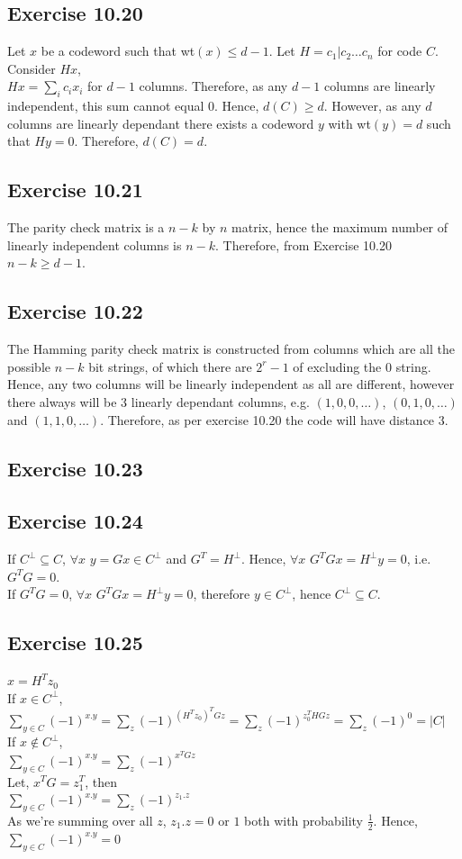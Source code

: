 \documentclass[a4paper,12pt]{article}
\begin{document}
\subsection*{Exercise 10.20}
Let $x$ be a codeword such that wt$(x)\leq d-1$. Let $H={c_1|c_2\ldots c_n}$ for code $C$. Consider $Hx$,\\
$Hx=\displaystyle \sum_ic_ix_i$ for $d-1$ columns. Therefore, as any $d-1$ columns are linearly
independent, this sum cannot equal $0$. Hence, $d(C)\geq d$. However, as any $d$ columns
are linearly dependant there exists a codeword $y$ with wt$(y)=d$ such that $Hy=0$. Therefore,
$d(C)=d$.
\subsection*{Exercise 10.21}
The parity check matrix is a $n-k$ by $n$ matrix, hence the maximum number of linearly independent
columns is $n-k$. Therefore, from Exercise 10.20 $n-k\geq d-1$.
\subsection*{Exercise 10.22}
The Hamming parity check matrix is constructed from columns which are all the possible
$n-k$ bit strings, of which there are $2^r-1$ of excluding the $0$ string. Hence, any
two columns will be linearly independent as all are different, however there always will be $3$
linearly dependant columns, e.g. $(1,0,0,\ldots)$, $(0,1,0,\ldots)$ and $(1,1,0,\ldots)$.
Therefore, as per exercise 10.20 the code will have distance $3$. 
\subsection*{Exercise 10.23}

\subsection*{Exercise 10.24}
If $C^\perp\subseteq C$, $\forall x$ ${y=Gx}\in C^\perp$ and $G^T=H^\perp$.
Hence, $\forall x$ $G^TGx=H^\perp y=0$, i.e. $G^TG=0$.\\
If $G^TG=0$, $\forall x$ $G^TGx=H^\perp y=0$, therefore $y\in C^\perp$, hence
$C^\perp\subseteq C$.
\subsection*{Exercise 10.25}
$x=H^Tz_0$\\
If $x\in C^\perp$, \\
$\displaystyle \sum_{y\in C} (-1)^{x.y}=\sum_{z}(-1)^{(H^Tz_0)^TGz}=
\sum_{z}(-1)^{z_0^THGz}=\sum_{z}(-1)^{0}=|C|$\\
If $x\notin C^\perp$,\\
$\displaystyle \sum_{y\in C} (-1)^{x.y}=\sum_{z}(-1)^{x^TGz}$\\
Let, $x^TG=z_1^T$, then\\
$\displaystyle \sum_{y\in C} (-1)^{x.y}=\sum_z(-1)^{z_1.z}$\\
As we're summing over all $z$, $z_1.z=0$ or $1$ both with probability $\frac{1}{2}$.
Hence,\\
$\displaystyle \sum_{y\in C} (-1)^{x.y}=0$
\end{document}
